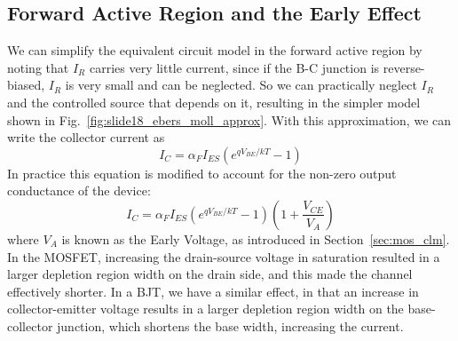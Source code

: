 \subsection{Forward Active Region and the Early Effect}
We can simplify the equivalent circuit model in the forward active region by noting that $I_R$ carries very little current, since if the B-C junction is reverse-biased, $I_R$ is very small and can be neglected.  So we can practically neglect $I_R$ and the controlled source that depends on it, resulting in the simpler model shown in Fig.~\ref{fig:slide18_ebers_moll_approx}.
With this approximation, we can write the collector current as
    \begin{equation}
        I_C = \alpha_F I_{ES} \left( e^{qV_{BE}/kT} -1 \right)
    \end{equation}
In practice this equation is modified to account for the non-zero output conductance of the device:
    \begin{equation}
        I_C = \alpha_F I_{ES} \left( e^{qV_{BE}/kT} -1 \right) \left( 1 + \frac{V_{CE}}{V_A} \right)
    \end{equation}
where $V_A$ is known as the Early Voltage, as introduced in Section~\ref{sec:mos_clm}.  In the MOSFET, increasing the drain-source voltage in saturation resulted in a larger depletion region width on the drain side, and this made the channel effectively shorter.  In a BJT, we have a similar effect, in that an increase in collector-emitter voltage results in a larger depletion region width on the base-collector junction, which shortens the base width, increasing the current.

